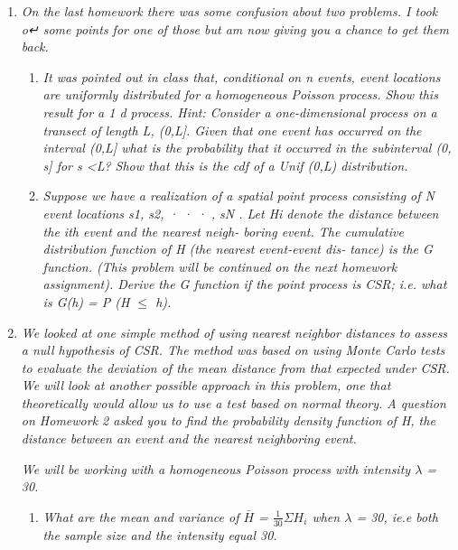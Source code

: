 \documentclass{article}\usepackage[]{graphicx}\usepackage[]{color}
\begin{document}
\begin{enumerate}
\item %
{\it On the last homework there was some confusion about two problems. I took o↵ some points for one of those but am now giving you a chance to get them back.}

\begin{enumerate}
\item %
{\it It was pointed out in class that, conditional on n events, event locations are uniformly distributed for a homogeneous Poisson process. Show this result for a 1   d process. Hint: Consider a one-dimensional process on a transect of length L, (0,L]. Given that one event has occurred on the interval (0,L] what is the probability that it occurred in the subinterval (0, s] for s \textless L? Show that this is the cdf of a Unif (0,L) distribution.}

\vspace{3in}

\item %
{\it Suppose we have a realization of a spatial point process consisting of N event locations {s1, s2, · · · , sN }. Let Hi denote the distance between the ith event and the nearest neigh- boring event. The cumulative distribution function of H (the nearest event-event dis- tance) is the G function. (This problem will be continued on the next homework assignment). Derive the G function if the point process is CSR; i.e. what is G(h) = P (H $\leq$ h).}

\vspace{4in}

\end{enumerate}

\item %
{\it We looked at one simple method of using nearest neighbor distances to assess a null hypothesis of CSR. The method was based on using Monte Carlo tests to evaluate the deviation of the mean distance from that expected under CSR. We will look at another possible approach in this problem, one that theoretically would allow us to use a test based on normal theory. A question on Homework 2 asked you to find the probability density function of H, the distance between an event and the nearest neighboring event.}

{\it We will be working with a homogeneous Poisson process with intensity $\lambda$  = 30.}
\begin{enumerate}
\item %
{\it What are the mean and variance of $\bar{H}$ = $\frac{1}{30}\Sigma H_{i}$ when $\lambda$ = 30, ie.e both the sample size and the intensity equal 30.}



\end{enumerate}
\end{enumerate}
\end{document}
